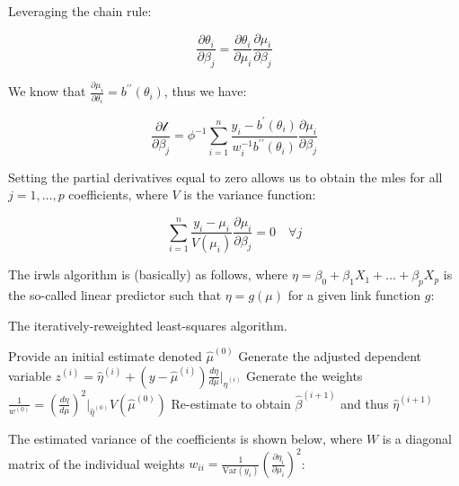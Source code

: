 \documentclass{report}
\begin{document}
Leveraging the chain rule:

\begin{equation}\label{eq:glm-chain-rule}
    \frac{\partial\theta_i}{\partial\beta_j} = \frac{\partial\theta_i}{\partial\mu_i}\frac{\partial\mu_i}{\partial\beta_j}
\end{equation}

We know that $\frac{\partial\mu_i}{\partial\theta_i} = b^{\prime\prime}(\theta_i)$, thus we have:

\begin{equation}\label{eq:glm-score-equation-2}
    \frac{\partial\mathcal{l}}{\partial\beta_j} = \phi^{-1} \sum_{i=1}^n \frac{y_i - b^\prime(\theta_i)}{w_i^{-1}b^{\prime\prime}(\theta_i)} \frac{\partial\mu_i}{\partial\beta_j}
\end{equation}

Setting the partial derivatives equal to zero allows us to obtain the \glspl{mle} for all $j = 1, \dots, p$ coefficients, where $V$ is the variance function:

\begin{equation}\label{eq:glm-score-equation-3}
    \sum_{i=1}^n \frac{y_i - \mu_i}{V(\mu_i)} \frac{\partial\mu_i}{\partial\beta_j} = 0 \quad \forall j
\end{equation}

The \gls{irwls} algorithm is (basically) as follows, where $\eta = \beta_0 + \beta_1X_1 + \dots + \beta_pX_p$ is the so-called linear predictor such that $\eta = g(\mu)$ for a given link function $g$:

\begin{algorithm}[h!]
    \caption{The iteratively-reweighted least-squares algorithm.}\label{alg:IRWLS}
    \begin{algorithmic}[1]
        \STATE Provide an initial estimate denoted $\hat{\mu}^{(0)}$
            \STATE Generate the adjusted dependent variable $z^{(i)} = \hat{\eta}^{(i)} + (y - \hat{\mu}^{(i)})\frac{d\eta}{d\mu}|_{\hat{\eta}^{(i)}}$
            \STATE Generate the weights $\frac{1}{w^{(0)}} = \left(\frac{d\eta}{d\mu}\right)^2|_{\hat{\eta}^{(0)}}V(\hat{\mu}^{(0)})$
            \STATE Re-estimate to obtain $\hat{\beta}^{(i+1)}$ and thus $\hat{\eta}^{(i+1)}$
        \ENDFOR
    \end{algorithmic}
\end{algorithm}

The estimated variance of the coefficients is shown below, where $W$ is a diagonal matrix of the individual weights $w_{ii} = \frac{1}{\text{Var}(y_i)}\left(\frac{\partial\eta_i}{\partial\mu_i}\right)^2$:
\end{document}
